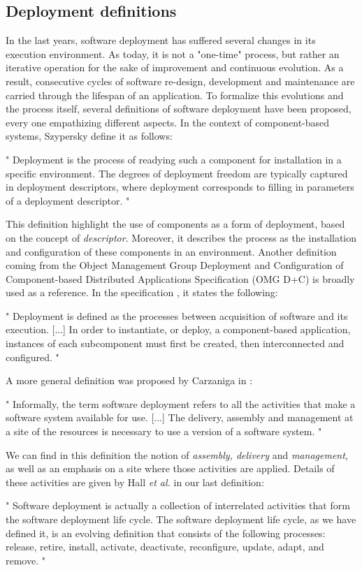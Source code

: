 \subsection{Deployment definitions}
In the last years, software deployment has suffered several changes in its execution environment.
As today, it is not a "one-time" process, but rather an iterative operation for the sake of improvement and continuous evolution.
As a result, consecutive cycles of software re-design, development and maintenance are carried through the lifespan of an application.
To formalize this evolutions and the process itself, several definitions of software deployment have been proposed, every one empathizing different aspects.
In the context of component-based systems, Szypersky\cite{szyperski2003component} define it as follows:
\begin{citeverbatim}
	" Deployment is the process of readying such a component for installation in a specific environment. 
	The degrees of deployment freedom are typically captured in deployment descriptors, where deployment corresponds to filling in parameters of a deployment descriptor. "
\end{citeverbatim}
This definition highlight the use of components as a form of deployment, based on the concept of \textit{descriptor}.
Moreover, it describes the process as the installation and configuration of these components in an environment.
Another definition coming from the Object Management Group Deployment and Configuration of Component-based Distributed Applications Specification (OMG D+C) is broadly used as a reference.
In the specification \cite{specification2006deployment}, it states the following:
\begin{citeverbatim}
	" Deployment is defined as the processes between acquisition of software and its execution. [...] In order to instantiate, or deploy, a component-based application, instances of each subcomponent must first be created, then interconnected and configured. "
\end{citeverbatim}
A more general definition was proposed by Carzaniga in \cite{carzaniga1997characterization}:
\begin{citeverbatim}
	" Informally, the term software deployment refers to all the activities that make a software system available for use. [...] The delivery, assembly and management at a site of the resources is necessary to use a version of a software system. "
\end{citeverbatim}
We can find in this definition the notion of \textit{assembly, delivery} and \textit{management}, as well as an emphasis on a site where those activities are applied.
Details of these activities are given by Hall \textit{et al.}\cite{hall1999cooperative} in our last definition:
\begin{citeverbatim}
	" Software deployment is actually a collection of interrelated activities that form the software deployment life cycle. 
	The software deployment life cycle, as we have defined it, is an evolving definition that consists of the following processes: release, retire, install, activate, deactivate, reconfigure, update, adapt, and remove. "
\end{citeverbatim}

